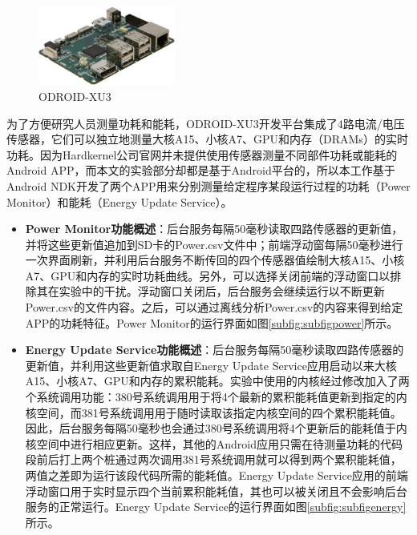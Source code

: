\begin{figure}[htbp]
    \begin{center}
    \includegraphics[width=0.4\textwidth, height=0.4\textwidth]{figures/odroid.pdf}
    \end{center}
    \caption{ODROID-XU3}\label{figure:figureodroid}
\end{figure}

为了方便研究人员测量功耗和能耗，ODROID-XU3开发平台集成了4路电流/电压传感器，它们可以独立地测量大核A15、小核A7、GPU和内存（DRAMs）的实时功耗。因为Hardkernel公司官网并未提供使用传感器测量不同部件功耗或能耗的Android APP，而本文的实验部分却都是基于Android平台的，所以本工作基于Android NDK开发了两个APP用来分别测量给定程序某段运行过程的功耗（Power Monitor）和能耗（Energy Update Service）。
\begin{itemize}
  \item \textbf{Power Monitor功能概述}：后台服务每隔50毫秒读取四路传感器的更新值，并将这些更新值追加到SD卡的Power.csv文件中；前端浮动窗每隔50毫秒进行一次界面刷新，并利用后台服务不断传回的四个传感器值绘制大核A15、小核A7、GPU和内存的实时功耗曲线。另外，可以选择关闭前端的浮动窗口以排除其在实验中的干扰。浮动窗口关闭后，后台服务会继续运行以不断更新Power.csv的文件内容。之后，可以通过离线分析Power.csv的内容来得到给定APP的功耗特征。Power Monitor的运行界面如图\ref{subfig:subfigpower}所示。
  \item \textbf{Energy Update Service功能概述}：后台服务每隔50毫秒读取四路传感器的更新值，并利用这些更新值求取自Energy Update Service应用启动以来大核A15、小核A7、GPU和内存的累积能耗。实验中使用的内核经过修改加入了两个系统调用功能：380号系统调用用于将4个最新的累积能耗值更新到指定的内核空间，而381号系统调用用于随时读取该指定内核空间的四个累积能耗值。因此，后台服务每隔50毫秒也会通过380号系统调用将4个更新后的能耗值于内核空间中进行相应更新。这样，其他的Android应用只需在待测量功耗的代码段前后打上两个桩通过两次调用381号系统调用就可以得到两个累积能耗值，两值之差即为运行该段代码所需的能耗值。Energy Update Service应用的前端浮动窗口用于实时显示四个当前累积能耗值，其也可以被关闭且不会影响后台服务的正常运行。Energy Update Service的运行界面如图\ref{subfig:subfigenergy}所示。
\end{itemize}

